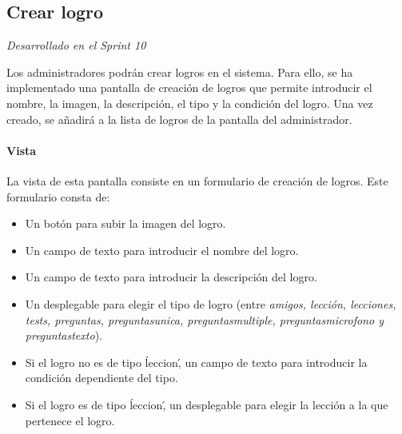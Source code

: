 \subsection{Crear logro} 

\textit{Desarrollado en el Sprint 10}

Los administradores podrán crear logros en el sistema. Para ello, se ha implementado una pantalla de creación de logros que permite introducir 
el nombre, la imagen, la descripción, el tipo y la condición del logro. Una vez creado, se añadirá a la lista de logros de la pantalla del administrador.


\paragraph*{Vista}
La vista de esta pantalla consiste en un formulario de creación de logros. Este formulario consta de:
\begin{itemize}
  \item Un botón para subir la imagen del logro.
  \item Un campo de texto para introducir el nombre del logro.
  \item Un campo de texto para introducir la descripción del logro.
  \item Un desplegable para elegir el tipo de logro (entre \textit{amigos, lección, lecciones, tests, preguntas, preguntasunica, preguntasmultiple, preguntasmicrofono y preguntastexto}).  
  \item Si el logro no es de tipo \'leccion\', un campo de texto para introducir la condición dependiente del tipo.
  \item Si el logro es de tipo \'leccion\', un desplegable para elegir la lección a la que pertenece el logro.
\end{itemize}

